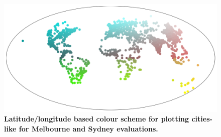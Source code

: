 \documentclass[Crown,sageh,times]{sagej}
\begin{document}
\begin{figure}[!htbp]
\centering    
\includegraphics[scale=0.25]{Images/PlosOne/Fig5.png} 
\caption{\bf Latitude/longitude based colour scheme for plotting cities-like for Melbourne and Sydney evaluations.}    
 \label{fig:colorscheme}  
\end{figure} 
\end{document}
